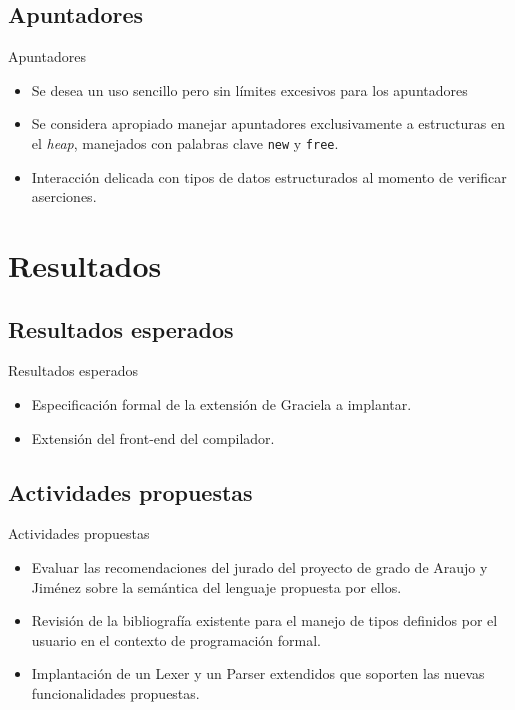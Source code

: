 \documentclass{beamer}
\begin{document}
\subsection{Apuntadores}
\begin{frame}{Apuntadores}
\begin{itemize}
  \item Se desea un uso sencillo pero sin límites excesivos para los apuntadores
  \item Se considera apropiado manejar apuntadores exclusivamente a estructuras en el \textit{heap},
    manejados con palabras clave \texttt{new} y \texttt{free}.
  \item Interacción delicada con tipos de datos estructurados al momento de verificar aserciones.
\end{itemize}
\end{frame}

\section{Resultados}

\subsection{Resultados esperados}
\begin{frame}{Resultados esperados}
\begin{itemize}
  \item Especificación formal de la extensión de Graciela a implantar.
  \item Extensión del front-end del compilador.
\end{itemize}

\end{frame}

\subsection{Actividades propuestas}
\begin{frame}{Actividades propuestas}
\begin{itemize}
  \item Evaluar las recomendaciones del jurado del proyecto de grado de Araujo y
Jiménez sobre la semántica del lenguaje propuesta por ellos.
  \item Revisión de la bibliografía existente para el manejo de tipos definidos
por el usuario en el contexto de programación formal.
  \item Implantación de un Lexer y un Parser extendidos que soporten las nuevas
funcionalidades propuestas.
\end{itemize}

\end{frame}
\end{document}
